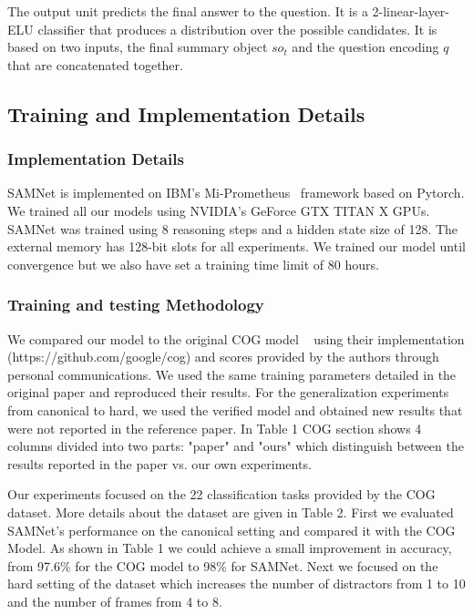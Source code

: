 The output unit predicts the final answer to the question. It is a 2-linear-layer-ELU classifier that produces a distribution over the possible candidates. It is based on two inputs, the final summary object $so_t$ and the question encoding $q$ that are concatenated together. 
 

\subsection{Training and Implementation Details}

\subsubsection{Implementation Details}


SAMNet is implemented on IBM's Mi-Prometheus~\cite{kornuta2018accelerating} framework based on Pytorch. 
We trained all our models using NVIDIA’s GeForce GTX TITAN X GPUs. SAMNet was trained using 8 reasoning steps and a hidden state size of 128. The external memory has 128-bit slots for all experiments. We trained our model until convergence but we also have set a training time limit of 80 hours.

\subsubsection{Training and testing Methodology}

We compared our model to the original COG model  ~\cite{yang2018dataset} using their implementation (https://github.com/google/cog) and scores provided by the authors through personal communications. We used the same training parameters detailed in the original paper and reproduced their results.  For the generalization experiments from canonical to hard, we used the verified model and obtained new results that were not reported in the reference paper.   In Table 1 COG section shows 4 columns divided into two parts: "paper" and "ours" which distinguish between the results reported in the paper vs. our own experiments.

Our experiments focused on the 22 classification tasks provided by the COG dataset. More details about the dataset are given in Table 2. First we evaluated SAMNet's performance on the canonical setting and compared it with the COG Model. As shown in Table 1 we could achieve a small improvement in accuracy, from 97.6\% for the COG model to 98\% for SAMNet. Next we focused on the hard setting of the dataset which increases the number of distractors from 1 to 10 and the number of frames from 4 to 8.

